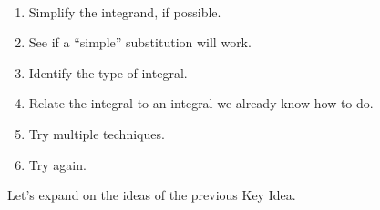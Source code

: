 \clearpage

\begin{keyidea}\label{ki_int_strat}%
\mbox{}\\[-2\baselineskip]\parbox[t]{\linewidth}{%
\begin{enumerate}
	\item Simplify the integrand, if possible.
	\item See if a ``simple'' substitution will work.
	\item Identify the type of integral.
	\item Relate the integral to an integral we already know how to do.
	\item Try multiple techniques.
	\item Try again.
\end{enumerate}}
\end{keyidea}

Let's expand on the ideas of the previous Key Idea.

